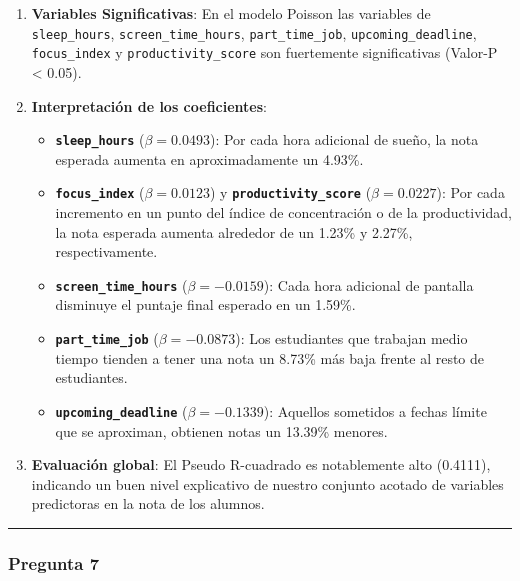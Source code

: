 \documentclass[11pt]{article}
\providecommand{\tightlist}{%
      \setlength{\itemsep}{0pt}\setlength{\parskip}{0pt}}
\begin{document}
\begin{enumerate}
\def\labelenumi{\arabic{enumi}.}
\item
  \textbf{Variables Significativas}: En el modelo Poisson las variables
  de \texttt{sleep\_hours}, \texttt{screen\_time\_hours},
  \texttt{part\_time\_job}, \texttt{upcoming\_deadline},
  \texttt{focus\_index} y \texttt{productivity\_score} son fuertemente
  significativas (Valor-P \textless{} 0.05).
\item
  \textbf{Interpretación de los coeficientes}:

  \begin{itemize}
  \tightlist
  \item
    \textbf{\texttt{sleep\_hours}} (\(\beta = 0.0493\)): Por cada hora
    adicional de sueño, la nota esperada aumenta en aproximadamente un
    4.93\%.
  \item
    \textbf{\texttt{focus\_index}} (\(\beta = 0.0123\)) y
    \textbf{\texttt{productivity\_score}} (\(\beta = 0.0227\)): Por cada
    incremento en un punto del índice de concentración o de la
    productividad, la nota esperada aumenta alrededor de un 1.23\% y
    2.27\%, respectivamente.
  \item
    \textbf{\texttt{screen\_time\_hours}} (\(\beta = -0.0159\)): Cada
    hora adicional de pantalla disminuye el puntaje final esperado en un
    1.59\%.
  \item
    \textbf{\texttt{part\_time\_job}} (\(\beta = -0.0873\)): Los
    estudiantes que trabajan medio tiempo tienden a tener una nota un
    8.73\% más baja frente al resto de estudiantes.
  \item
    \textbf{\texttt{upcoming\_deadline}} (\(\beta = -0.1339\)): Aquellos
    sometidos a fechas límite que se aproximan, obtienen notas un
    13.39\% menores.
  \end{itemize}
\item
  \textbf{Evaluación global}: El Pseudo R-cuadrado es notablemente alto
  (0.4111), indicando un buen nivel explicativo de nuestro conjunto
  acotado de variables predictoras en la nota de los alumnos.
\end{enumerate}

    \begin{center}\rule{0.5\linewidth}{0.5pt}\end{center}

\subsubsection{Pregunta 7}\label{pregunta-7}
\end{document}
